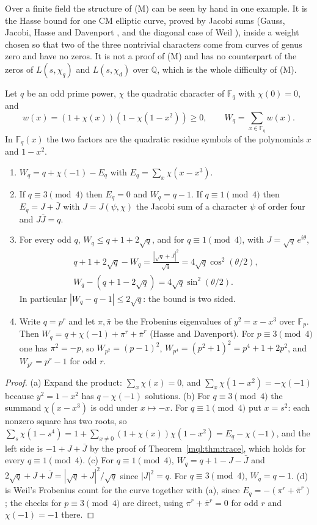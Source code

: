 Over a finite field the structure of (M) can be seen by hand in one example. It is the Hasse bound for one CM elliptic curve, proved by Jacobi sums (Gauss, Jacobi, Hasse and Davenport \cite{DavenportHasse35}, and the diagonal case of Weil \cite{Weil49}), inside a weight chosen so that two of the three nontrivial characters come from curves of genus zero and have no zeros. It is not a proof of (M) and has no counterpart of the zeros of $L(s,\chi_q)$ and $L(s,\chi_d)$ over $\mathbb Q$, which is the whole difficulty of (M).

Let $q$ be an odd prime power, $\chi$ the quadratic character of $\mathbb F_q$ with $\chi(0)=0$, and
\[
w(x)=(1+\chi(x))(1-\chi(1-x^2))\ge0,\qquad W_q=\sum_{x\in\mathbb F_q}w(x).
\]
In $\mathbb F_q(x)$ the two factors are the quadratic residue symbols of the polynomials $x$ and $1-x^2$.

\begin{theorem}\label{mql:thm:ffM}
\begin{enumerate}
\item $W_q=q+\chi(-1)-E_q$ with $E_q=\sum_x\chi(x-x^3)$.
\item If $q\equiv3\pmod4$ then $E_q=0$ and $W_q=q-1$. If $q\equiv1\pmod4$ then $E_q=J+\bar J$ with $J=J(\psi,\chi)$ the Jacobi sum of a character $\psi$ of order four and $J\bar J=q$.
\item For every odd $q$, $W_q\le q+1+2\sqrt q$, and for $q\equiv1\pmod4$, with $J=\sqrt q\,e^{i\theta}$,
\begin{gather*}
q+1+2\sqrt q-W_q=\frac{|\sqrt q+J|^2}{\sqrt q}=4\sqrt q\cos^2(\theta/2),\\ W_q-(q+1-2\sqrt q)=4\sqrt q\sin^2(\theta/2).
\end{gather*}
In particular $|W_q-q-1|\le2\sqrt q$: the bound is two sided.
\item Write $q=p^r$ and let $\pi,\bar\pi$ be the Frobenius eigenvalues of $y^2=x-x^3$ over $\mathbb F_p$. Then $W_q=q+\chi(-1)+\pi^r+\bar\pi^r$ (Hasse and Davenport). For $p\equiv3\pmod4$ one has $\pi^2=-p$, so $W_{p^2}=(p-1)^2$, $W_{p^4}=(p^2+1)^2=p^4+1+2p^2$, and $W_{p^r}=p^r-1$ for odd $r$.
\end{enumerate}
\end{theorem}

\begin{proof}
(a) Expand the product: $\sum_x\chi(x)=0$, and $\sum_x\chi(1-x^2)=-\chi(-1)$ because $y^2=1-x^2$ has $q-\chi(-1)$ solutions. (b) For $q\equiv3\pmod4$ the summand $\chi(x-x^3)$ is odd under $x\mapsto-x$. For $q\equiv1\pmod4$ put $x=s^2$: each nonzero square has two roots, so $\sum_s\chi(1-s^4)=1+\sum_{x\ne0}(1+\chi(x))\chi(1-x^2)=E_q-\chi(-1)$, and the left side is $-1+J+\bar J$ by the proof of Theorem~\ref{mql:thm:trace}, which holds for every $q\equiv1\pmod4$. (c) For $q\equiv1\pmod4$, $W_q=q+1-J-\bar J$ and $2\sqrt q+J+\bar J=|\sqrt q+J|^2/\sqrt q$ since $|J|^2=q$. For $q\equiv3\pmod4$, $W_q=q-1$. (d) is Weil's Frobenius count for the curve together with (a), since $E_q=-(\pi^r+\bar\pi^r)$; the checks for $p\equiv3\pmod4$ are direct, using $\pi^r+\bar\pi^r=0$ for odd $r$ and $\chi(-1)=-1$ there.
\end{proof}

